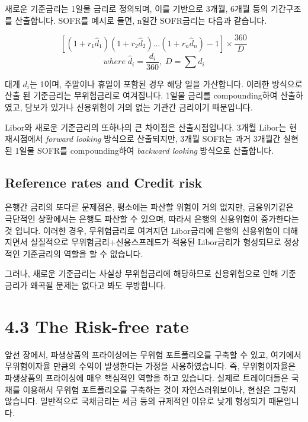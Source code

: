 \documentclass[
  letterpaper,
  DIV=11,
  numbers=noendperiod]{scrreprt}
\begin{document}
새로운 기준금리는 1일물 금리로 정의되며, 이를 기반으로 3개월, 6개월 등의
기간구조를 산출합니다. SOFR를 예시로 들면, n일간 SOFR금리는 다음과
같습니다.

\[[(1+r_1 \hat{d}_1)(1+r_2 \hat{d}_2)\dots(1+r_n \hat{d}_n)-1]\times \frac{360}{D}\]
\[where\;\hat{d}_i=\frac{d_i}{360},\;D=\sum d_i\]

대게 \(d_i\)는 1이며, 주말이나 휴일이 포함된 경우 해당 일을 가산합니다.
이러한 방식으로 산출 된 기준금리는 무위험금리로 여겨집니다. 1일물 금리를
compounding하여 산출하였고, 담보가 있거나 신용위험이 거의 없는 기관간
금리이기 때문입니다.

Libor와 새로운 기준금리의 또하나의 큰 차이점은 산출시점입니다. 3개월
Libor는 현재시점에서 \emph{forward looking} 방식으로 산출되지만, 3개월
SOFR는 과거 3개월간 실현된 1일물 SOFR를 compounding하여 \emph{backward
looking} 방식으로 산출합니다.

\subsection*{Reference rates and Credit
risk}\label{reference-rates-and-credit-risk}

은행간 금리의 또다른 문제점은, 평소에는 파산할 위험이 거의 없지만,
금융위기같은 극단적인 상황에서는 은행도 파산할 수 있으며, 따라서 은행의
신용위험이 증가한다는 것 입니다. 이러한 경우, 무위험금리로 여겨지던
Libor금리에 은행의 신용위험이 더해지면서 실질적으로
무위험금리+신용스프레드가 적용된 Libor금리가 형성되므로 정상적인
기준금리의 역할을 할 수 없습니다.

그러나, 새로운 기준금리는 사실상 무위험금리에 해당하므로 신용위험으로
인해 기준금리가 왜곡될 문제는 없다고 봐도 무방합니다.

\section*{4.3 The Risk-free rate}\label{the-risk-free-rate}


앞선 장에서, 파생상품의 프라이싱에는 무위험 포트폴리오를 구축할 수 있고,
여기에서 무위험이자율 만큼의 수익이 발생한다는 가정을 사용하였습니다.
즉, 무위험이자율은 파생상품의 프라이싱에 매우 핵심적인 역할을 하고
있습니다. 실제로 트레이더들은 국채를 이용해서 무위험 포트폴리오를
구축하는 것이 자연스러워보이나, 현실은 그렇지 않습니다. 일반적으로
국채금리는 세금 등의 규제적인 이유로 낮게 형성되기 때문입니다.
\end{document}
